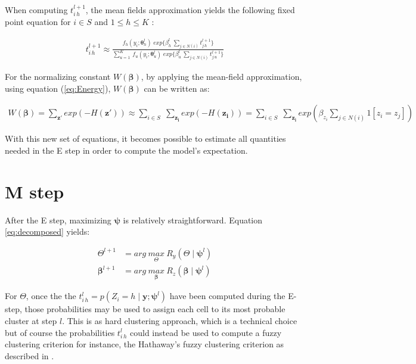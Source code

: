 When computing $t_{i\,h}^{l+1}$, the mean fields approximation yields the following fixed point equation for $i \in S$ and $1 \leq h \leq K$ \citep{Dang98}:

\begin{align}
\label{eq:fixedpoint}
t_{i\,h}^{l+1} \approx \frac{f_{h} (y_i;\boldsymbol{\theta}_{h}^l)\; exp\{\beta_h^l \: \sum_{j \in N(i)} t_{j\,h}^{l+1}\}}{\sum_{u=1}^K \: f_{u} (y_i;\boldsymbol{\theta}_{u}^l)\; exp\{\beta_u^l \: \sum_{j \in N(i)} t_{j\,u}^{l+1}\}}
\end{align}


For the normalizing constant $W(\boldsymbol{\beta})$, by applying the mean-field approximation, using equation (\ref{eq:Energy}), $W(\boldsymbol{\beta})$ can be written as:

\begin{align*}
W(\boldsymbol{\beta}) = \sum\limits_{\boldsymbol{z'}} exp(-H(\boldsymbol{z'})) \approx \sum\limits_{i \in S}\;\sum\limits_{\boldsymbol{z_i}} exp(-H(\boldsymbol{z_i})) = \sum\limits_{i \in S}\;\sum\limits_{\boldsymbol{z_i}} exp(\beta_{z_i}\sum\limits_{j \in N(i)}1[z_i=z_j])
\end{align*}

With this new set of equations, it becomes possible to estimate all quantities needed in the E step in order to compute the model's expectation.\\

\section{M step}
After the E step, maximizing $\boldsymbol{\psi}$ is relatively straightforward. Equation \ref{eq:decomposed} yields:

\begin{align*}
\Theta^{l+1} &= arg\:\underset{\Theta}{max}\:R_y(\Theta\mid \boldsymbol{\psi}^l)\\
\boldsymbol{\beta}^{l+1} &= arg\:\underset{\boldsymbol{\beta}}{max}\:R_z(\boldsymbol{\beta}\mid \boldsymbol{\psi}^l)
\end{align*}

For $\Theta$, once the the $t_{i\,h}^{l} = p(Z_i = h \mid \boldsymbol{y};\boldsymbol{\psi}^{l})$ have been computed during the E-step, those probabilities may be used to assign each cell to its most probable cluster at step $l$. This is as hard clustering approach, which is a technical choice but of course the probabilities $t_{i\,h}^{l}$ could instead be used to compute a fuzzy clustering criterion for instance, the Hathaway's fuzzy clustering criterion as described in \citep{Dang98}.\\
 
